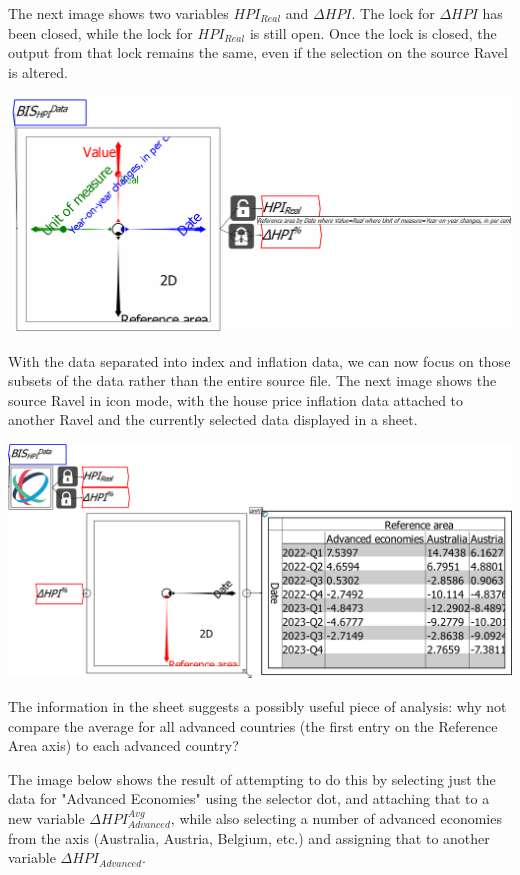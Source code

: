 The next image shows two variables $HPI_{Real}$ and $\Delta{HPI}$.
The lock for $\Delta{HPI}$ has been closed, while the lock for $HPI_{Real}$
is still open. Once the lock is closed, the output from that lock
remains the same, even if the selection on the source Ravel is altered.

\includegraphics[width=15cm]{images/tut05HPIandInflationSeparatedLocks}

With the data separated into index and inflation data, we can now
focus on those subsets of the data rather than the entire source file.
The next image shows the source Ravel in icon mode, with the house
price inflation data attached to another Ravel and the currently selected
data displayed in a sheet.

\includegraphics[width=15cm]{images/tut06HPIwithVariablesAssigned02DeltaHPI}

The information in the sheet suggests a possibly useful piece of analysis:
why not compare the average for all advanced countries (the first
entry on the Reference Area axis) to each advanced country?

The image below shows the result of attempting to do this by selecting
just the data for "Advanced Economies" using the selector dot, and
attaching that to a new variable $\Delta{HPI}_{Advanced}^{Avg}$,
while also selecting a number of advanced economies from the axis
(Australia, Austria, Belgium, etc.) and assigning that to another
variable $\Delta{HPI}_{Advanced}$.

